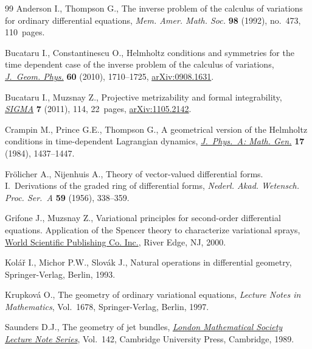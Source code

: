 \documentclass[11pt]{article}
\begin{document}
\begin{thebibliography}{99}
Anderson I., Thompson G., The inverse problem of the calculus of variations for
  ordinary dif\/ferential equations, \textit{Mem. Amer. Math. Soc.} \textbf{98}
  (1992), no.~473, 110~pages.

Bucataru I., Constantinescu O., Helmholtz conditions and symmetries for the
  time dependent case of the inverse problem of the calculus of variations,
  \href{http://dx.doi.org/10.1016/j.geomphys.2010.06.016}{\textit{J.~Geom. Phys.}} \textbf{60} (2010), 1710--1725, \href{http://arxiv.org/abs/0908.1631}{arXiv:0908.1631}.

Bucataru I., Muzsnay Z., Projective metrizability and formal integrability,
  \href{http://dx.doi.org/10.3842/SIGMA.2011.114}{\textit{SIGMA}} \textbf{7} (2011), 114, 22~pages, \href{http://arxiv.org/abs/1105.2142}{arXiv:1105.2142}.

Crampin M., Prince G.E., Thompson G., A geometrical version of the {H}elmholtz
  conditions in time-dependent {L}agrangian dynamics, \href{http://dx.doi.org/10.1088/0305-4470/17/7/011}{\textit{J.~Phys.~A: Math.
  Gen.}} \textbf{17} (1984), 1437--1447.

Fr{\"o}licher A., Nijenhuis A., Theory of vector-valued dif\/ferential forms.
  {I}.~{D}erivations of the graded ring of dif\/ferential forms, \textit{Nederl.
  Akad. Wetensch. Proc. Ser.~A} \textbf{59} (1956), 338--359.

Grifone J., Muzsnay Z., Variational principles for second-order dif\/ferential
  equations. Application of the Spencer theory to characterize variational
  sprays, \href{http://dx.doi.org/10.1142/9789812813596}{World Scientif\/ic Publishing Co. Inc.}, River Edge, NJ, 2000.

Kol{\'a}{\v{r}} I., Michor P.W., Slov{\'a}k J., Natural operations in
  dif\/ferential geometry, Springer-Verlag, Berlin, 1993.

Krupkov{\'a} O., The geometry of ordinary variational equations,
  \textit{Lecture Notes in Mathematics}, Vol.~1678, Springer-Verlag, Berlin,
  1997.

Saunders D.J., The geometry of jet bundles, \href{http://dx.doi.org/10.1017/CBO9780511526411}{\textit{London Mathematical Society
  Lecture Note Series}}, Vol.~142, Cambridge University Press, Cambridge, 1989.

\end{thebibliography}
\end{document}
